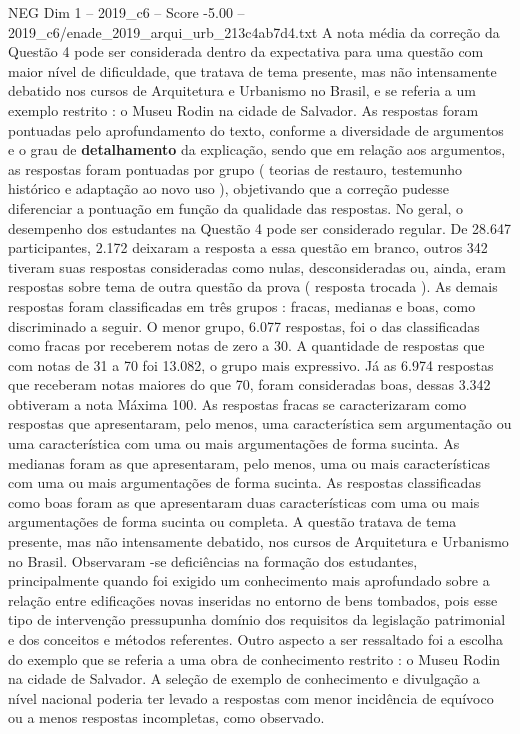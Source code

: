 \begin{textsample}{NEG Dim 1 – 2019\_c6 – Score -5.00 – 2019\_c6/enade\_2019\_arqui\_urb\_213c4ab7d4.txt}
A nota média da correção da Questão 4 pode ser considerada dentro da expectativa para uma questão com maior nível de dificuldade, que tratava de tema presente, mas não intensamente debatido nos cursos de Arquitetura e Urbanismo no Brasil, e se referia a um exemplo restrito : o Museu Rodin na cidade de Salvador.
As respostas foram pontuadas pelo aprofundamento do texto, conforme a diversidade de argumentos e o grau de \textbf{detalhamento} da explicação, sendo que em relação aos argumentos, as respostas foram pontuadas por grupo ( teorias de restauro, testemunho histórico e adaptação ao novo uso ), objetivando que a correção pudesse diferenciar a pontuação em função da qualidade das respostas.
No geral, o desempenho dos estudantes na Questão 4 pode ser considerado regular.
De 28.647 participantes, 2.172 deixaram a resposta a essa questão em branco, outros 342 tiveram suas respostas consideradas como nulas, desconsideradas ou, ainda, eram respostas sobre tema de outra questão da prova ( resposta trocada ).
As demais respostas foram classificadas em três grupos : fracas, medianas e boas, como discriminado a seguir.
O menor grupo, 6.077 respostas, foi o das classificadas como fracas por receberem notas de zero a 30.
A quantidade de respostas que com notas de 31 a 70 foi 13.082, o grupo mais expressivo.
Já as 6.974 respostas que receberam notas maiores do que 70, foram consideradas boas, dessas 3.342 obtiveram a nota Máxima 100.
As respostas fracas se caracterizaram como respostas que apresentaram, pelo menos, uma característica sem argumentação ou uma característica com uma ou mais argumentações de forma sucinta.
As medianas foram as que apresentaram, pelo menos, uma ou mais características com uma ou mais argumentações de forma sucinta.
As respostas classificadas como boas foram as que apresentaram duas características com uma ou mais argumentações de forma sucinta ou completa.
A questão tratava de tema presente, mas não intensamente debatido, nos cursos de Arquitetura e Urbanismo no Brasil.
Observaram -se deficiências na formação dos estudantes, principalmente quando foi exigido um conhecimento mais aprofundado sobre a relação entre edificações novas inseridas no entorno de bens tombados, pois esse tipo de intervenção pressupunha domínio dos requisitos da legislação patrimonial e dos conceitos e métodos referentes.
Outro aspecto a ser ressaltado foi a escolha do exemplo que se referia a uma obra de conhecimento restrito : o Museu Rodin na cidade de Salvador.
A seleção de exemplo de conhecimento e divulgação a nível nacional poderia ter levado a respostas com menor incidência de equívoco ou a menos respostas incompletas, como observado.

\end{textsample}
